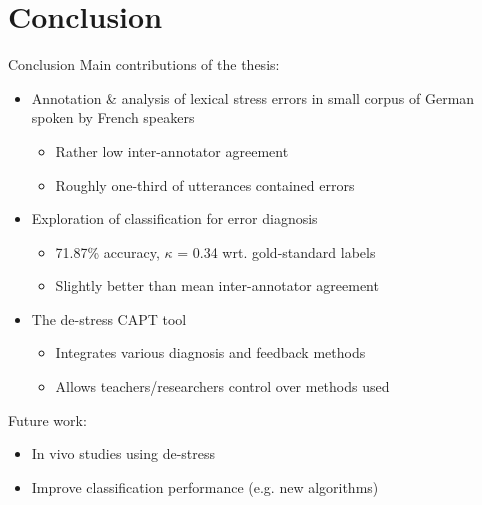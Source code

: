 \documentclass[xcolor={dvipsnames}]{beamer}
\begin{document}
\section{Conclusion}
		\begin{frame}{Conclusion}
		Main contributions of the thesis:
		\begin{itemize}
		\pause
		\item Annotation \& analysis of lexical stress errors in small corpus of German spoken by French speakers
			\begin{itemize}
			\item Rather low inter-annotator agreement
			\item Roughly one-third of utterances contained errors
			\end{itemize}
			
		\pause
		\item Exploration of classification for error diagnosis
			\begin{itemize}
			\item 71.87\% accuracy, $\kappa$ = 0.34 wrt. gold-standard labels
			\item Slightly better than mean inter-annotator agreement
			\end{itemize}
		
		\pause
		\item The de-stress CAPT tool
			\begin{itemize}
			\item Integrates various diagnosis and feedback methods
			\item Allows teachers/researchers control over methods used
			\end{itemize}
		\end{itemize}
		\pause
		\vfill
		Future work:
		\begin{itemize}
			\item In vivo studies using de-stress
			\item Improve classification performance (e.g. new algorithms)
		\end{itemize}
		\end{frame}

%	
\end{document}

